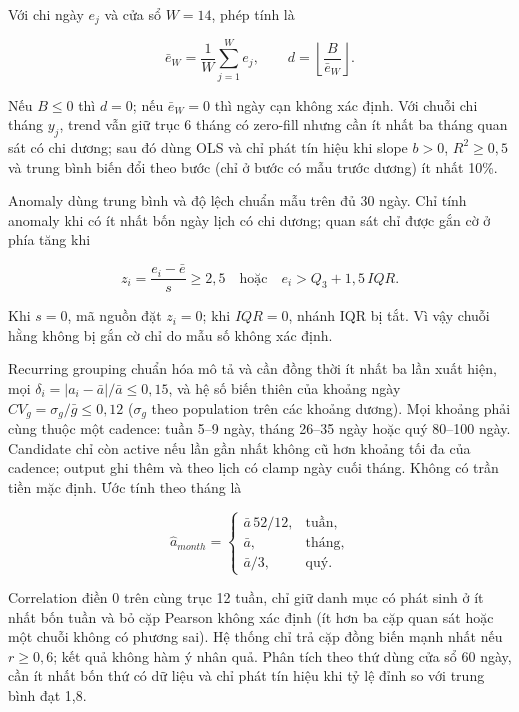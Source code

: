 Với chi ngày $e_j$ và cửa sổ $W=14$, phép tính là

\begin{equation}
  \bar e_W=\frac{1}{W}\sum_{j=1}^{W}e_j,\qquad
  d=\left\lfloor\frac{B}{\bar e_W}\right\rfloor.
\end{equation}

Nếu $B\leq0$ thì $d=0$; nếu $\bar e_W=0$ thì ngày cạn không xác định. Với chuỗi chi tháng $y_j$, trend vẫn giữ trục 6 tháng có zero-fill nhưng cần ít nhất ba tháng quan sát có chi dương; sau đó dùng OLS và chỉ phát tín hiệu khi slope $b>0$, $R^2\geq0{,}5$ và trung bình biến đổi theo bước (chỉ ở bước có mẫu trước dương) ít nhất 10\%.

Anomaly dùng trung bình và độ lệch chuẩn mẫu trên đủ 30 ngày. Chỉ tính anomaly khi có ít nhất bốn ngày lịch có chi dương; quan sát chỉ được gắn cờ ở phía tăng khi

\begin{equation}
  z_i=\frac{e_i-\bar e}{s}\geq2{,}5
  \quad\text{hoặc}\quad
  e_i>Q_3+1{,}5\,IQR.
\end{equation}

Khi $s=0$, mã nguồn đặt $z_i=0$; khi $IQR=0$, nhánh IQR bị tắt. Vì vậy chuỗi hằng không bị gắn cờ chỉ do mẫu số không xác định.

Recurring grouping chuẩn hóa mô tả và cần đồng thời ít nhất ba lần xuất hiện, mọi $\delta_i=|a_i-\bar a|/\bar a\leq0{,}15$, và hệ số biến thiên của khoảng ngày $CV_g=\sigma_g/\bar g\leq0{,}12$ ($\sigma_g$ theo population trên các khoảng dương). Mọi khoảng phải cùng thuộc một cadence: tuần 5--9 ngày, tháng 26--35 ngày hoặc quý 80--100 ngày. Candidate chỉ còn active nếu lần gần nhất không cũ hơn khoảng tối đa của cadence; output ghi thêm  và  theo lịch có clamp ngày cuối tháng. Không có trần tiền mặc định. Ước tính theo tháng là

\begin{equation}
  \widehat a_{month}=\begin{cases}
    \bar a\,52/12, & \text{tuần},\\
    \bar a, & \text{tháng},\\
    \bar a/3, & \text{quý}.
  \end{cases}
\end{equation}

Correlation điền 0 trên cùng trục 12 tuần, chỉ giữ danh mục có phát sinh ở ít nhất bốn tuần và bỏ cặp Pearson không xác định (ít hơn ba cặp quan sát hoặc một chuỗi không có phương sai). Hệ thống chỉ trả cặp đồng biến mạnh nhất nếu $r\geq0{,}6$; kết quả không hàm ý nhân quả. Phân tích theo thứ dùng cửa sổ 60 ngày, cần ít nhất bốn thứ có dữ liệu và chỉ phát tín hiệu khi tỷ lệ đỉnh so với trung bình đạt 1,8.

